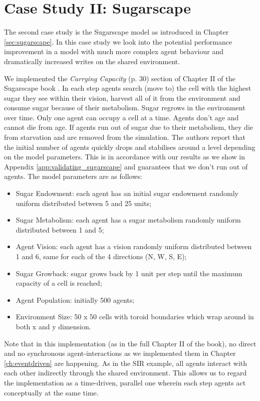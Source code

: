 \section{Case Study II: Sugarscape}
\label{sec:sugarscape_concurrent}
The second case study is the Sugarscape model as introduced in Chapter \ref{sec:sugarscape}. In this case study we look into the potential performance improvement in a model with much more complex agent behaviour and dramatically increased writes on the shared environment.

We implemented the \textit{Carrying Capacity} (p. 30) section of Chapter II of the Sugarscape book \cite{epstein_growing_1996}. In each step agents search (move to) the cell with the highest sugar they see within their vision, harvest all of it from the environment and consume sugar because of their metabolism. Sugar regrows in the environment over time. Only one agent can occupy a cell at a time. Agents don't age and cannot die from age. If agents run out of sugar due to their metabolism, they die from starvation and are removed from the simulation. The authors report that the initial number of agents quickly drops and stabilises around a level depending on the model parameters. This is in accordance with our results as we show in Appendix \ref{app:validating_sugarscape} and guarantees that we don't run out of agents. The model parameters are as follows:

\begin{itemize}
	\item Sugar Endowment: each agent has an initial sugar endowment randomly uniform distributed between 5 and 25 units;
	\item Sugar Metabolism: each agent has a sugar metabolism randomly uniform distributed between 1 and 5;
	\item Agent Vision: each agent has a vision randomly uniform distributed between 1 and 6, same for each of the 4 directions (N, W, S, E);
	\item Sugar Growback: sugar grows back by 1 unit per step until the maximum capacity of a cell is reached;
	\item Agent Population: initially 500 agents;
	\item Environment Size: 50 x 50 cells with toroid boundaries which wrap around in both x and y dimension.
\end{itemize}

Note that in this implementation (as in the full Chapter II of the book), no direct and no synchronous agent-interactions as we implemented them in Chapter \ref{ch:eventdriven} are happening. As in the SIR example, all agents interact with each other indirectly through the shared environment. This allows us to regard the implementation as a time-driven, parallel one wherein each step agents act conceptually at the same time.

